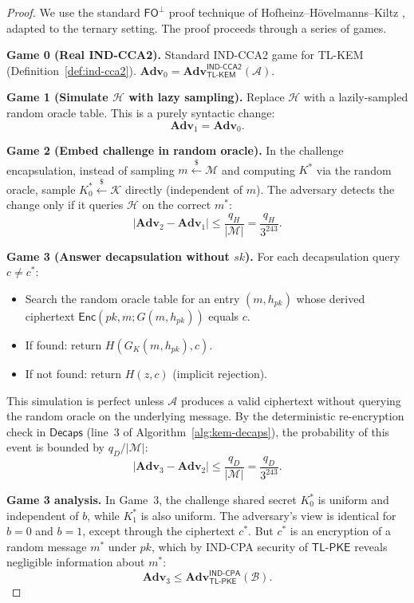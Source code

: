 \documentclass[11pt,a4paper]{article}
\theoremstyle{definition}
\newcommand{\Adv}{\mathbf{Adv}}
\newcommand{\Enc}{\textsf{Enc}}
\newcommand{\Decaps}{\textsf{Decaps}}
\newcommand{\TLKEM}{\textsf{TL-KEM}}
\newcommand{\INDCPA}{\textsf{IND-CPA}}
\newcommand{\INDCCA}{\textsf{IND-CCA2}}
\newcommand{\FO}{\textsf{FO}}
\newcommand{\CPAPKE}{\textsf{TL-PKE}}
\newcommand{\Hash}{\mathcal{H}}
\begin{document}
\begin{proof}
We use the standard $\FO^{\bot}$ proof technique of Hofheinz--H\"ovelmanns--Kiltz \cite{HHK17}, adapted to the ternary setting. The proof proceeds through a series of games.

\medskip
\noindent\textbf{Game 0 (Real IND-CCA2).}
Standard IND-CCA2 game for TL-KEM (Definition~\ref{def:ind-cca2}).
$\Adv_0 = \Adv^{\INDCCA}_{\TLKEM}(\mathcal{A})$.

\medskip
\noindent\textbf{Game 1 (Simulate $\Hash$ with lazy sampling).}
Replace $\Hash$ with a lazily-sampled random oracle table. This is a purely syntactic change:
\[
  \Adv_1 = \Adv_0.
\]

\medskip
\noindent\textbf{Game 2 (Embed challenge in random oracle).}
In the challenge encapsulation, instead of sampling $m \xleftarrow{\$} \mathcal{M}$ and computing $K^*$ via the random oracle, sample $K^*_0 \xleftarrow{\$} \mathcal{K}$ directly (independent of $m$). The adversary detects the change only if it queries $\Hash$ on the correct $m^*$:
\[
  |\Adv_2 - \Adv_1| \leq \frac{q_H}{|\mathcal{M}|}
  = \frac{q_H}{3^{243}}.
\]

\medskip
\noindent\textbf{Game 3 (Answer decapsulation without $sk$).}
For each decapsulation query $c \neq c^*$:
\begin{itemize}[leftmargin=2em]
  \item Search the random oracle table for an entry $(m, h_{pk})$ whose derived ciphertext $\Enc(pk, m; G(m, h_{pk}))$ equals $c$.
  \item If found: return $H(G_K(m, h_{pk}), c)$.
  \item If not found: return $H(z, c)$ (implicit rejection).
\end{itemize}
This simulation is perfect unless $\mathcal{A}$ produces a valid ciphertext without querying the random oracle on the underlying message. By the deterministic re-encryption check in $\Decaps$ (line~3 of Algorithm~\ref{alg:kem-decaps}), the probability of this event is bounded by $q_D / |\mathcal{M}|$:
\[
  |\Adv_3 - \Adv_2| \leq \frac{q_D}{|\mathcal{M}|}
  = \frac{q_D}{3^{243}}.
\]

\medskip
\noindent\textbf{Game 3 analysis.}
In Game~3, the challenge shared secret $K^*_0$ is uniform and independent of $b$, while $K^*_1$ is also uniform. The adversary's view is identical for $b=0$ and $b=1$, except through the ciphertext $c^*$. But $c^*$ is an encryption of a random message $m^*$ under $pk$, which by IND-CPA security of $\CPAPKE$ reveals negligible information about $m^*$:
\[
  \Adv_3 \leq \Adv^{\INDCPA}_{\CPAPKE}(\mathcal{B}).
\]


\end{proof}
\end{document}
